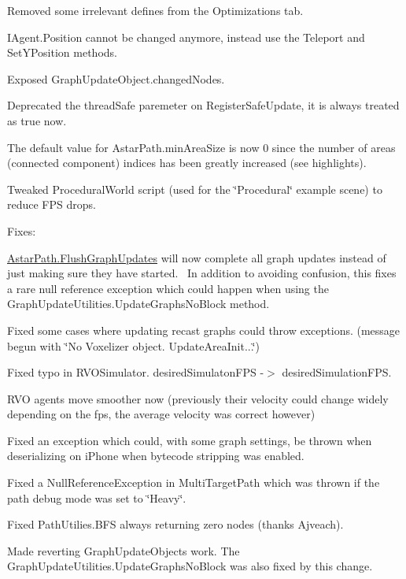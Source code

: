 \begin{DoxyItemize}
\begin{DoxyItemize}
\begin{DoxyItemize}
\item Removed some irrelevant defines from the Optimizations tab.
\item I\+Agent.\+Position cannot be changed anymore, instead use the Teleport and Set\+Y\+Position methods.
\item Exposed Graph\+Update\+Object.\+changed\+Nodes.
\item Deprecated the thread\+Safe paremeter on Register\+Safe\+Update, it is always treated as true now.
\item The default value for Astar\+Path.\+min\+Area\+Size is now 0 since the number of areas (connected component) indices has been greatly increased (see highlights).
\item Tweaked Procedural\+World script (used for the \char`\"{}\+Procedural\char`\"{} example scene) to reduce F\+PS drops.
\end{DoxyItemize}
\item Fixes\+:
\begin{DoxyItemize}
\item \mbox{\hyperlink{class_astar_path_af1c57d0189ace1df1057118032c47223}{Astar\+Path.\+Flush\+Graph\+Updates}} will now complete all graph updates instead of just making sure they have started.~\newline
 In addition to avoiding confusion, this fixes a rare null reference exception which could happen when using the Graph\+Update\+Utilities.\+Update\+Graphs\+No\+Block method.
\item Fixed some cases where updating recast graphs could throw exceptions. (message begun with \char`\"{}\+No Voxelizer object. Update\+Area\+Init...\char`\"{})
\item Fixed typo in R\+V\+O\+Simulator. desired\+Simulaton\+F\+PS -\/$>$ desired\+Simulation\+F\+PS.
\item R\+VO agents move smoother now (previously their velocity could change widely depending on the fps, the average velocity was correct however)
\item Fixed an exception which could, with some graph settings, be thrown when deserializing on i\+Phone when bytecode stripping was enabled.
\item Fixed a Null\+Reference\+Exception in Multi\+Target\+Path which was thrown if the path debug mode was set to \char`\"{}\+Heavy\char`\"{}.
\item Fixed Path\+Utilies.\+B\+FS always returning zero nodes (thanks Ajveach).
\item Made reverting Graph\+Update\+Objects work. The Graph\+Update\+Utilities.\+Update\+Graphs\+No\+Block was also fixed by this change.

\end{DoxyItemize}
\end{DoxyItemize}
\end{DoxyItemize}
